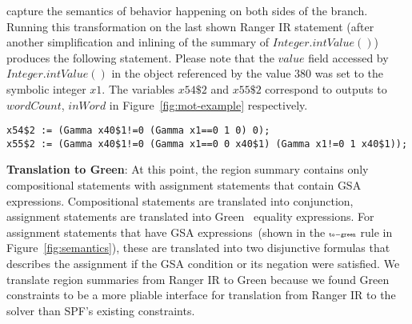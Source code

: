 capture the semantics of behavior happening on both sides of the branch.
%
Running this transformation on the last shown Ranger IR statement (after another simplification and inlining of the
summary of $Integer.intValue()$) produces the following statement.
%
Please note that the $value$ field accessed by $Integer.intValue()$ in the object referenced by the value
380 was set to the symbolic integer $x1$.
%
The variables $x54\$2$ and $x55\$2$ correspond to outputs to $wordCount$, $inWord$ in Figure~\ref{fig:mot-example} respectively.
\begin{lstlisting}
x54$2 := (Gamma x40$1!=0 (Gamma x1==0 1 0) 0);
x55$2 := (Gamma x40$1!=0 (Gamma x1==0 0 x40$1) (Gamma x1!=0 1 x40$1));
\end{lstlisting}
\textbf{Translation to Green}:
%
At this point, the region summary contains only compositional statements with assignment statements that contain
GSA expressions.
%
Compositional statements are translated into conjunction, assignment statements are translated into Green~\cite{green}
equality expressions.
%
For assignment statements that have GSA expressions~(shown in the $\scriptscriptstyle\mathtt{to-green}$ rule in Figure~\ref{fig:semantics}),
these are translated into two disjunctive formulas that describes the assignment if the GSA condition or its negation
were satisfied.
%
We translate region summaries from Ranger IR to Green because we found Green constraints to be a more pliable interface
for translation from Ranger IR to the solver than SPF\rq s existing constraints.

